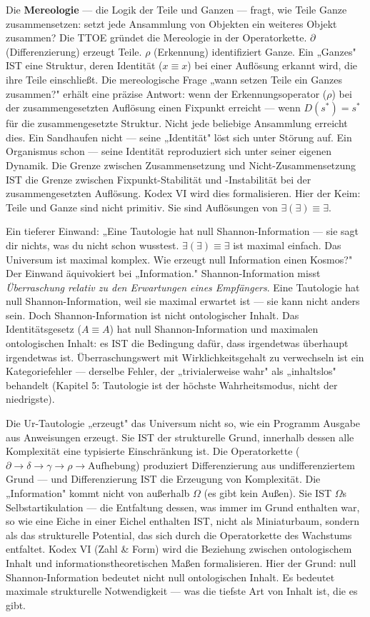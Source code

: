 \documentclass[10pt, openany, oneside]{book}
\begin{document}
Die \textbf{Mereologie} --- die Logik der Teile und Ganzen --- fragt, wie Teile Ganze zusammensetzen: setzt jede Ansammlung von Objekten ein weiteres Objekt zusammen? Die TTOE gründet die Mereologie in der Operatorkette. $\partial$ (Differenzierung) erzeugt Teile. $\rho$ (Erkennung) identifiziert Ganze. Ein „Ganzes" IST eine Struktur, deren Identität ($x \equiv x$) bei einer Auflösung erkannt wird, die ihre Teile einschließt. Die mereologische Frage „wann setzen Teile ein Ganzes zusammen?" erhält eine präzise Antwort: wenn der Erkennungsoperator ($\rho$) bei der zusammengesetzten Auflösung einen Fixpunkt erreicht --- wenn $D(s^*) = s^*$ für die zusammengesetzte Struktur. Nicht jede beliebige Ansammlung erreicht dies. Ein Sandhaufen nicht --- seine „Identität" löst sich unter Störung auf. Ein Organismus schon --- seine Identität reproduziert sich unter seiner eigenen Dynamik. Die Grenze zwischen Zusammensetzung und Nicht-Zusammensetzung IST die Grenze zwischen Fixpunkt-Stabilität und -Instabilität bei der zusammengesetzten Auflösung. Kodex VI wird dies formalisieren. Hier der Keim: Teile und Ganze sind nicht primitiv. Sie sind Auflösungen von $\exists(\exists) \equiv \exists$.

Ein tieferer Einwand: „Eine Tautologie hat null Shannon-Information --- sie sagt dir nichts, was du nicht schon wusstest. $\exists(\exists) \equiv \exists$ ist maximal einfach. Das Universum ist maximal komplex. Wie erzeugt null Information einen Kosmos?" Der Einwand äquivokiert bei „Information." Shannon-Information misst \textit{Überraschung relativ zu den Erwartungen eines Empfängers}. Eine Tautologie hat null Shannon-Information, weil sie maximal erwartet ist --- sie kann nicht anders sein. Doch Shannon-Information ist nicht ontologischer Inhalt. Das Identitätsgesetz ($A \equiv A$) hat null Shannon-Information und maximalen ontologischen Inhalt: es IST die Bedingung dafür, dass irgendetwas überhaupt irgendetwas ist. Überraschungswert mit Wirklichkeitsgehalt zu verwechseln ist ein Kategoriefehler --- derselbe Fehler, der „trivialerweise wahr" als „inhaltslos" behandelt (Kapitel 5: Tautologie ist der höchste Wahrheitsmodus, nicht der niedrigste).

Die Ur-Tautologie „erzeugt" das Universum nicht so, wie ein Programm Ausgabe aus Anweisungen erzeugt. Sie IST der strukturelle Grund, innerhalb dessen alle Komplexität eine typisierte Einschränkung ist. Die Operatorkette ($\partial \to \delta \to \gamma \to \rho \to \text{Aufhebung}$) produziert Differenzierung aus undifferenziertem Grund --- und Differenzierung IST die Erzeugung von Komplexität. Die „Information" kommt nicht von außerhalb $\Omega$ (es gibt kein Außen). Sie IST $\Omega$s Selbstartikulation --- die Entfaltung dessen, was immer im Grund enthalten war, so wie eine Eiche in einer Eichel enthalten IST, nicht als Miniaturbaum, sondern als das strukturelle Potential, das sich durch die Operatorkette des Wachstums entfaltet. Kodex VI (Zahl \& Form) wird die Beziehung zwischen ontologischem Inhalt und informationstheoretischen Maßen formalisieren. Hier der Grund: null Shannon-Information bedeutet nicht null ontologischen Inhalt. Es bedeutet maximale strukturelle Notwendigkeit --- was die tiefste Art von Inhalt ist, die es gibt.
\end{document}
